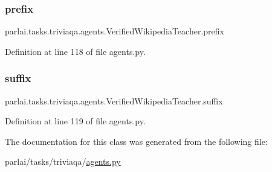 \subsubsection{\texorpdfstring{prefix}{prefix}}
{\footnotesize\ttfamily parlai.\+tasks.\+triviaqa.\+agents.\+Verified\+Wikipedia\+Teacher.\+prefix}



Definition at line 118 of file agents.\+py.

\mbox{\label{classparlai_1_1tasks_1_1triviaqa_1_1agents_1_1VerifiedWikipediaTeacher_acc499929543ea473b7b298e28e22acab}} 
\subsubsection{\texorpdfstring{suffix}{suffix}}
{\footnotesize\ttfamily parlai.\+tasks.\+triviaqa.\+agents.\+Verified\+Wikipedia\+Teacher.\+suffix}



Definition at line 119 of file agents.\+py.



The documentation for this class was generated from the following file\+:\begin{DoxyCompactItemize}
\item 
parlai/tasks/triviaqa/\hyperlink{parlai_2tasks_2triviaqa_2agents_8py}{agents.\+py}\end{DoxyCompactItemize}
